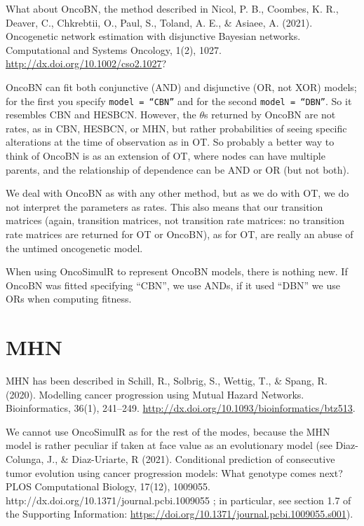 \documentclass[11pt]{article}
\begin{document}
What about OncoBN, the method described in Nicol, P. B., Coombes, K. R., Deaver, C., Chkrebtii, O., Paul, S., Toland, A. E., \& Asiaee, A. (2021). Oncogenetic network estimation with disjunctive Bayesian networks. Computational and Systems Oncology, 1(2), 1027. \url{http://dx.doi.org/10.1002/cso2.1027}?

OncoBN can fit both conjunctive (AND) and disjunctive (OR, not XOR) models; for the first you specify \texttt{model = ``CBN''} and for the second \texttt{model = ``DBN''}. So it resembles CBN and HESBCN. However, the $\theta$s returned by OncoBN are not rates, as in CBN, HESBCN, or MHN, but rather probabilities of seeing specific alterations at the time of observation as in OT. So probably a better way to think of OncoBN is as an extension of OT, where nodes can have multiple parents, and the relationship of dependence can be AND or OR (but not both).

We deal with OncoBN as with any other method, but as we do with OT, we do not interpret the parameters as rates. This also means that our transition matrices (again, transition matrices, not transition rate matrices: no transition rate matrices are returned for OT or OncoBN), as for OT, are really an abuse of the untimed oncogenetic model.

When using OncoSimulR to represent OncoBN models, there is nothing new. If OncoBN was fitted specifying  ``CBN'', we use ANDs, if it used ``DBN'' we use ORs when computing fitness. 



\section{MHN}\label{MHN}

MHN has been described in Schill, R., Solbrig, S., Wettig, T., \& Spang, R. (2020). Modelling cancer progression using Mutual Hazard Networks. Bioinformatics, 36(1), 241–249. \url{http://dx.doi.org/10.1093/bioinformatics/btz513}.

We cannot use OncoSimulR as for the rest of the modes, because the MHN model is rather peculiar if taken at face value as an evolutionary model (see Diaz-Colunga, J., \& Diaz-Uriarte, R (2021). Conditional prediction of consecutive tumor evolution using cancer progression models: What genotype comes next? PLOS Computational Biology, 17(12), 1009055. http://dx.doi.org/10.1371/journal.pcbi.1009055 ; in particular, see section 1.7 of the Supporting Information: \url{https://doi.org/10.1371/journal.pcbi.1009055.s001}).
\end{document}
